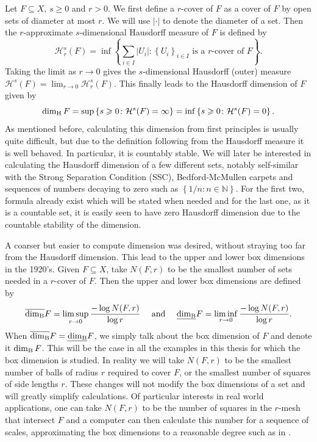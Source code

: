 Let $F\subseteq X$, $s\ge 0$ and $r > 0$. We first define a $r$-cover of $F$ as a cover of $F$ by open sets of diameter at most $r$. We will use $\lvert \cdot \rvert$ to denote the diameter of a set. Then the $r$-approximate $s$-dimensional Hausdorff measure of $F$ is defined by 
\[
\mathcal{H}^s_r (F) = \inf\left\{ \sum_{i\in I} \lvert U_i \rvert \colon \left\{U_i \right\}_{i\in I} \text{ is a $r$-cover of }F  \right\}.
\]
Taking the limit as $r \rightarrow 0 $ gives the $s$-dimensional Hausdorff (outer) measure $\mathcal{H}^s(F) = \lim_{r\rightarrow 0} \mathcal{H}^s_r(F)$. This finally leads to the Hausdorff dimension of $F$ given by
\[
\dim_{\text{H}} F = \sup\left\{s \geqslant 0 \colon \mathcal{H}^s(F) = \infty\right\} = \inf\left\{s\geqslant 0 \colon \mathcal{H}^s(F) = 0\right\}.
\]
As mentioned before, calculating this dimension from first principles is usually quite difficult, but due to the definition following from the Hausdorff measure it is well behaved. In particular, it is countably stable. We will later be interested in calculating the Hausdorff dimension of a few different sets, notably self-similar with the Strong Separation Condition (SSC), Bedford-McMullen carpets and sequences of numbers decaying to zero such as $\left\{1/n \colon n\in \mathbb{N}\right\}$. For the first two, formula already exist which will be stated when needed and for the last one, as it is a countable set, it is easily seen to have zero Hausdorff dimension due to the countable stability of the dimension.

A coarser but easier to compute dimension was desired, without straying too far from the Hausdorff dimension. This lead to the upper and lower box dimensions in the 1920's. Given $F\subseteq X$, take $N(F,r)$ to be the smallest number of sets needed in a $r$-cover of $F$. Then the upper and lower box dimensions are defined by
\[
\overline{\dim_{\textup{B}}} F = \limsup_{r \rightarrow 0} \frac{-\log N(F,r)}{\log r}   \quad \text{ and } \quad \underline{\dim_{\textup{B}}} F = \liminf_{r \rightarrow 0} \frac{-\log N(F,r)}{\log r}. 
\]
 When $\overline{\dim_{\textup{B}}} F = \underline{\dim_{\textup{B}}} F$, we simply talk about the box dimension of $F$ and denote it $\dim_{\textup{B}} F$. This will be the case in all the examples in this thesis for which the box dimension is studied. In reality we will take $N(F,r)$ to be the smallest number of balls of radius $r$ required to cover $F$, or the smallest number of squares of side lengths $r$. These changes will not modify the box dimensions of a set and will greatly simplify calculations. Of particular interests in real world applications, one can take $N(F,r)$ to be the number of squares in the $r$-mesh that intersect $F$ and a computer can then calculate this number for a sequence of scales, approximating the box dimensions to a reasonable degree such as in \cite{diieva}.




